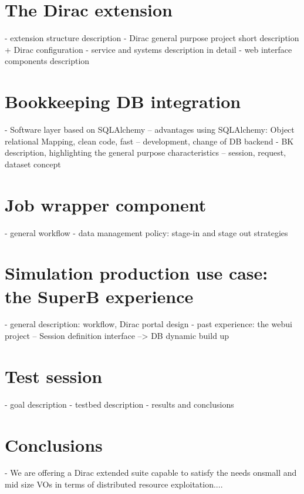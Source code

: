 \documentclass[a4paper]{jpconf}
\begin{document}
 
\section{The Dirac extension} 
- extension structure description
- Dirac general purpose project short description + Dirac configuration
- service and systems description in detail
- web interface components description


\section{Bookkeeping DB integration}
- Software layer based on SQLAlchemy
-- advantages using SQLAlchemy: Object relational Mapping, clean code, fast
-- development, change of DB backend
- BK description, highlighting the general purpose characteristics
-- session, request, dataset concept

 
\section{Job wrapper component}
- general workflow
- data management policy: stage-in and stage out strategies
 
\section{Simulation production use case: the SuperB experience}
- general description: workflow, Dirac portal design
- past experience: the webui project
-- Session definition interface --> DB dynamic build up
 
\section{Test session}
- goal description
- testbed description
- results and conclusions

\section{Conclusions}

- We are offering a Dirac extended suite capable to satisfy the
needs onsmall and mid size VOs in terms of distributed
resource exploitation....

\end{document}
